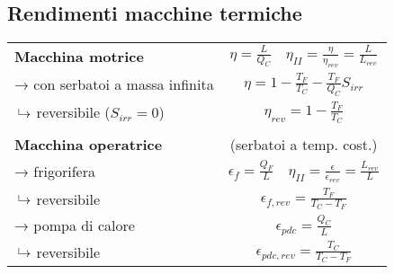\subsection{Rendimenti macchine termiche}
{\renewcommand{\arraystretch}{1.5}
\begin{tabular}{p{4cm}c}
\textbf{Macchina motrice} & $\eta = \frac{L}{Q_C} \quad \eta_{II} = \frac{\eta}{\eta_{rev}} = \frac{L}{L_{rev}} $ \\
→ con serbatoi a massa infinita & $\eta = 1 - \frac{T_F}{T_C} - \frac{T_F}{Q_C}S_{irr}$ \\
\phantom{→}$\put(3,2){\line(0,1){5}}\to$ reversibile ($S_{irr} = 0$) & $\eta_{rev} = 1 - \frac{T_F}{T_C}$ \\
\\
\textbf{Macchina operatrice} & (serbatoi a temp. cost.) \\
→ frigorifera & $\epsilon_f = \frac{Q_F}{L} \quad \eta_{II} = \frac{\epsilon}{\epsilon_{rev}} = \frac{L_{rev}}{L}$ \\
\phantom{→}$\put(3,2){\line(0,1){5}}\to$ reversibile & $\epsilon_{f,rev} = \frac{T_F}{T_C - T_F}$ \\
→ pompa di calore & $\epsilon_{pdc} = \frac{Q_C}{L}$ \\
\phantom{→}$\put(3,2){\line(0,1){5}}\to$ reversibile & $\epsilon_{pdc,rev} = \frac{T_C}{T_C - T_F}$ \\
\end{tabular}
}
